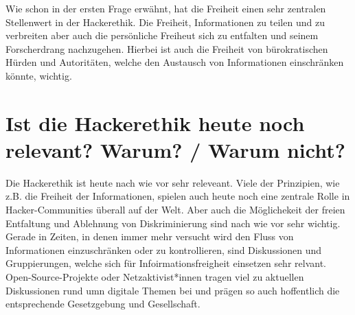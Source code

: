 \documentclass[12pt]{article}
\begin{document}
Wie schon in der ersten Frage erwähnt, hat die Freiheit einen sehr zentralen Stellenwert in der Hackerethik. Die Freiheit, Informationen zu teilen und zu verbreiten aber auch die persönliche Freiheut sich zu entfalten
und seinem Forscherdrang nachzugehen. Hierbei ist auch die Freiheit von bürokratischen Hürden und Autoritäten, welche den Austausch von Informationen einschränken könnte, wichtig.

\section{Ist die Hackerethik heute noch relevant? Warum? / Warum nicht?}

Die Hackerethik ist heute nach wie vor sehr releveant. Viele der Prinzipien, wie z.B. die Freiheit der Informationen, spielen auch heute noch eine zentrale Rolle in Hacker-Communities überall auf der Welt. Aber auch die
Möglichekeit der freien Entfaltung und Ablehnung von Diskriminierung sind nach wie vor sehr wichtig. Gerade in Zeiten, in denen immer mehr versucht wird den Fluss von Informationen einzuschränken oder zu kontrollieren, sind
Diskussionen und Gruppierungen, welche sich für Infoirmationsfreigheit einsetzen sehr relvant. Open-Source-Projekte oder Netzaktivist*innen tragen viel zu aktuellen Diskussionen rund umn digitale Themen bei und prägen
so auch hoffentlich die entsprechende Gesetzgebung und Gesellschaft.  
\end{document}
